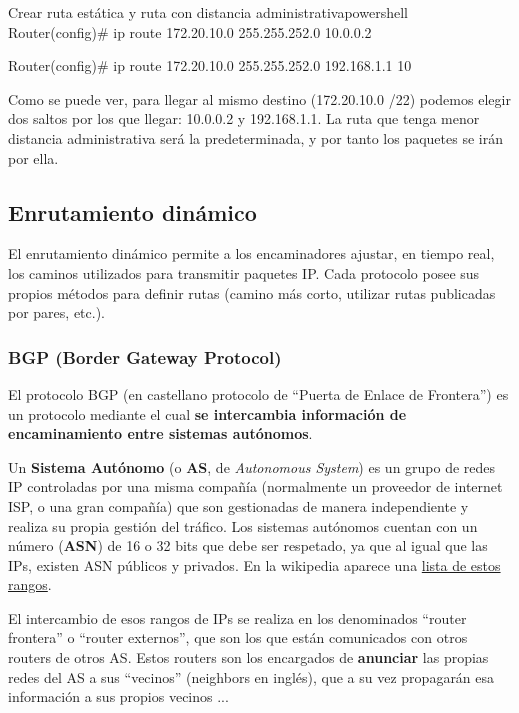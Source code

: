 \begin{mycode}{Crear ruta estática y ruta con distancia administrativa}{powershell}{}
Router(config)# ip route 172.20.10.0  255.255.252.0  10.0.0.2

Router(config)# ip route 172.20.10.0  255.255.252.0  192.168.1.1  10
\end{mycode}

Como se puede ver, para llegar al mismo destino (172.20.10.0 /22) podemos elegir dos saltos por los que llegar: 10.0.0.2 y 192.168.1.1. La ruta que tenga menor distancia administrativa será la predeterminada, y por tanto los paquetes se irán por ella.


\subsection{Enrutamiento dinámico}

El enrutamiento dinámico permite a los encaminadores ajustar, en tiempo real, los caminos utilizados para transmitir paquetes IP. Cada protocolo posee sus propios métodos para definir rutas (camino más corto, utilizar rutas publicadas por pares, etc.).


\subsubsection{BGP (Border Gateway Protocol)}
El protocolo BGP (en castellano protocolo de “Puerta de Enlace de Frontera”) es un protocolo mediante el cual \textbf{se intercambia información de encaminamiento entre sistemas autónomos}.


Un \textbf{Sistema Autónomo} (o \textbf{AS}, de \textit{Autonomous System}) es un grupo de redes IP controladas por una misma compañía (normalmente un proveedor de internet ISP, o una gran compañía) que son gestionadas de manera independiente y realiza su propia gestión del tráfico. Los sistemas autónomos cuentan con un número (\textbf{ASN}) de 16 o 32 bits que debe ser respetado, ya que al igual que las IPs, existen ASN públicos y privados. En la wikipedia aparece una \href{https://es.wikipedia.org/wiki/Sistema_aut%C3%B3nomo#Tabla_con_ASN_de_16-bit_y_32-bit}{lista de estos rangos}.

El intercambio de esos rangos de IPs se realiza en los denominados “router frontera” o “router externos”, que son los que están comunicados con otros routers de otros AS. Estos routers son los encargados de \textbf{anunciar} las propias redes del AS a sus “vecinos” (neighbors en inglés), que a su vez propagarán esa información a sus propios vecinos ...

